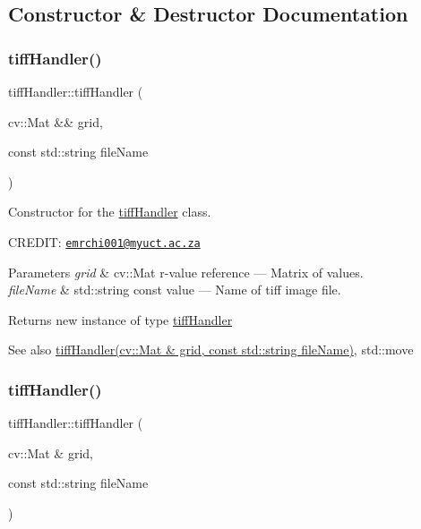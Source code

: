 \subsection{Constructor \& Destructor Documentation}
\mbox{\label{classtiffHandler_a9274e4f4c7985eb580303d66e0e72cf5}} 
\subsubsection{\texorpdfstring{tiff\+Handler()}{tiffHandler()}\hspace{0.1cm}{\footnotesize\ttfamily [1/5]}}
{\footnotesize\ttfamily tiff\+Handler\+::tiff\+Handler (\begin{DoxyParamCaption}\item[{cv\+::\+Mat \&\&}]{grid,  }\item[{const std\+::string}]{file\+Name }\end{DoxyParamCaption})}



Constructor for the \hyperlink{classtiffHandler}{tiff\+Handler} class. 

C\+R\+E\+D\+IT\+: \href{mailto:emrchi001@myuct.ac.za}{\tt emrchi001@myuct.\+ac.\+za}


\begin{DoxyParams}{Parameters}
{\em grid} & cv\+::\+Mat r-\/value reference --- Matrix of values. \\
\hline
{\em file\+Name} & std\+::string const value --- Name of tiff image file.\\
\hline
\end{DoxyParams}
\begin{DoxyReturn}{Returns}
new instance of type \hyperlink{classtiffHandler}{tiff\+Handler}
\end{DoxyReturn}
\begin{DoxySeeAlso}{See also}
\hyperlink{classtiffHandler_ae0de58defa2ae8612dab8a751ef23e07}{tiff\+Handler(cv\+::\+Mat \& grid, const std\+::string file\+Name)}, std\+::move 
\end{DoxySeeAlso}
\mbox{\label{classtiffHandler_ae0de58defa2ae8612dab8a751ef23e07}} 
\subsubsection{\texorpdfstring{tiff\+Handler()}{tiffHandler()}\hspace{0.1cm}{\footnotesize\ttfamily [2/5]}}
{\footnotesize\ttfamily tiff\+Handler\+::tiff\+Handler (\begin{DoxyParamCaption}\item[{cv\+::\+Mat \&}]{grid,  }\item[{const std\+::string}]{file\+Name }\end{DoxyParamCaption})}



